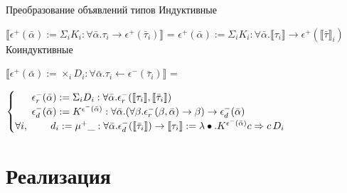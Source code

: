 \documentclass[10pt, mathserif]{beamer}
\let\\\tabularnewline
\let\\\tabularnewline
\newcommand{\sem}[1]{\llbracket #1\rrbracket}
\theoremstyle{definition}
\begin{document}
\begin{frame}[fragile]{Преобразование объявлений типов}
Индуктивные

$\sem{\epsilon^+(\bar{\alpha}):= \Sigma_i K_i :\forall\bar{\alpha}.\tau_i\to\epsilon^+(\bar{\tau}_i)}$ = 
  $\epsilon^+(\bar{\alpha}):= \Sigma_i K_i :\forall\bar{\alpha}.\sem{\tau_i}\to\epsilon^+(\sem{\bar{\tau}}_i) $\\
\vspace{1cm}
Коиндуктивные

$\sem{\epsilon^+(\bar{\alpha}):= \times_i D_i :\forall\bar{\alpha}.\tau_i \leftarrow\epsilon^-(\bar{\tau}_i)} $ =

\qquad
  $\begin{cases}
   \;\;\;\;\;\;\epsilon_r^-(\bar{\alpha}):=\Sigma_i D_i: \forall\bar{\alpha}.\epsilon_r^-(\sem{\tau_i},\sem{\bar{\tau}_i})\\
   \;\;\;\;\;\;\epsilon_d^-(\bar{\alpha}):=K^{\epsilon^-(\bar{\alpha})}:\forall\bar{\alpha}.(\forall\beta.\epsilon^-_r(\beta,\bar{\alpha})\to\beta)\to \epsilon_d^-(\bar{\alpha})\\
   \forall i,\;\;\;\;\;\;\;\;d_i:=\mu^+\_:\forall\bar{\alpha}.\epsilon^-_d(\sem{\bar{\tau}_i})\to \sem{\tau_i}:=\lambda\bullet.K^{\epsilon^-(\bar{\alpha})}c\Rightarrow c\, D_i\\
  \end{cases}$
\\
\end{frame}

\section{Реализация}
\end{document}
